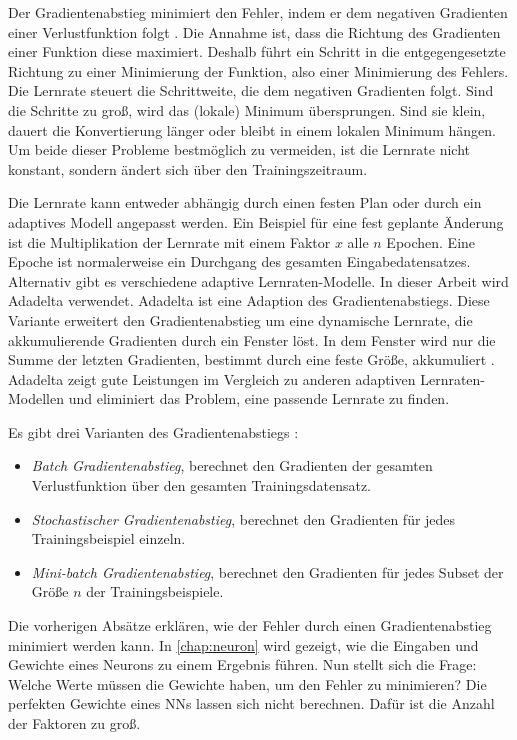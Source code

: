 Der Gradientenabstieg minimiert den Fehler, indem er dem negativen Gradienten einer Verlustfunktion folgt \cite{Ruder2016}. Die Annahme ist, dass die Richtung des Gradienten einer Funktion diese maximiert. Deshalb führt ein Schritt in die entgegengesetzte Richtung zu einer Minimierung der Funktion, also einer Minimierung des Fehlers. Die Lernrate steuert die Schrittweite, die dem negativen Gradienten folgt. Sind die Schritte zu groß, wird das (lokale) Minimum übersprungen. Sind sie klein, dauert die Konvertierung länger oder bleibt in einem lokalen Minimum hängen. Um beide dieser Probleme bestmöglich zu vermeiden, ist die Lernrate nicht konstant, sondern ändert sich über den Trainingszeitraum.

Die Lernrate kann entweder abhängig durch einen festen Plan oder durch ein adaptives Modell angepasst werden. Ein Beispiel für eine fest geplante Änderung ist die Multiplikation der Lernrate mit einem Faktor $x$ alle $n$ Epochen. Eine Epoche ist normalerweise ein Durchgang des gesamten Eingabedatensatzes. Alternativ gibt es verschiedene adaptive Lernraten-Modelle. In dieser Arbeit wird \zb{} Adadelta verwendet. Adadelta ist eine Adaption des Gradientenabstiegs. Diese Variante erweitert den Gradientenabstieg um eine dynamische Lernrate, die akkumulierende Gradienten durch ein Fenster löst. In dem Fenster wird nur die Summe der letzten Gradienten, bestimmt durch eine feste Größe, akkumuliert \cite{Zeiler2012}. Adadelta zeigt gute Leistungen im Vergleich zu anderen adaptiven Lernraten-Modellen und eliminiert das Problem, eine passende Lernrate zu finden.

Es gibt drei Varianten des Gradientenabstiegs \cite{Ruder2016}:
\begin{itemize}
  \item \emph{Batch Gradientenabstieg}, berechnet den Gradienten der gesamten Verlustfunktion über den gesamten Trainingsdatensatz. 
  \item \emph{Stochastischer Gradientenabstieg}, berechnet den Gradienten für jedes Trainingsbeispiel einzeln.
  \item \emph{Mini-batch Gradientenabstieg}, berechnet den Gradienten für jedes Subset der Größe $n$ der Trainingsbeispiele.
\end{itemize}

Die vorherigen Absätze erklären, wie der Fehler durch einen Gradientenabstieg minimiert werden kann. In \autoref{chap:neuron} wird gezeigt, wie die Eingaben und Gewichte eines Neurons zu einem Ergebnis führen. Nun stellt sich die Frage: Welche Werte müssen die Gewichte haben, um den Fehler zu minimieren? Die perfekten Gewichte eines \acp{NN} lassen sich nicht berechnen. Dafür ist die Anzahl der Faktoren zu groß.

